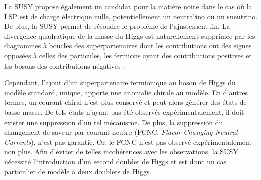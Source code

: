 La SUSY propose également un candidat pour la matière noire dans le cas où la LSP est de charge électrique nulle, potentiellement un neutralino ou un sneutrino.
De plus, la SUSY permet de résoudre le problème de l'ajustement fin.
La divergence quadratique de la masse du Higgs est naturellement supprimée par les diagrammes à boucles des superpartenaires dont les contributions ont des signes opposées à celles des particules, les fermions ayant des contributions positives et les bosons des contributions négatives~\cite{Higgs_hunter_guide}.
\par Cependant, l'ajout d'un superpartenaire fermionique au boson de Higgs du modèle standard, unique, apporte une anomalie chirale au modèle.
En d'autres termes, un courant chiral n'est plus conservé et peut alors générer des états de basse masse.
De tels états n'ayant pas été observés expérimentalement, il doit exister une suppression d'un tel mécanisme.
De plus, la suppression du changement de saveur par courant neutre (FCNC, \emph{Flavor-Changing Neutral Currents}), n'est pas garantie.
Or, le FCNC n'est pas observé expérimentalement non plus.
Afin d'éviter de telles incohérences avec les observations, la SUSY nécessite l'introduction d'un second doublet de Higgs et est donc un cas particulier de modèle à deux doublets de Higgs.

